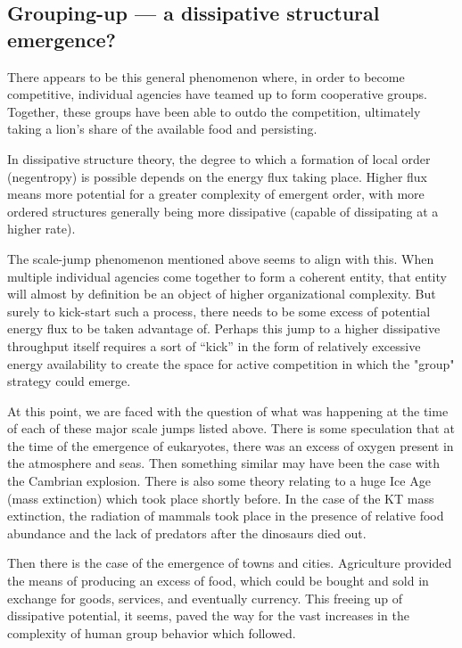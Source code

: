 \subsection{Grouping-up --- a dissipative structural emergence?}

There appears to be this general phenomenon where, in order to become competitive, individual agencies have teamed up to form cooperative groups. Together, these groups have been able to outdo the competition, ultimately taking a lion’s share of the available food and persisting.

In dissipative structure theory, the degree to which a formation of local order (negentropy) is possible depends on the energy flux taking place. Higher flux means more potential for a greater complexity of emergent order, with more ordered structures generally being more dissipative (capable of dissipating at a higher rate).

The scale-jump phenomenon mentioned above seems to align with this. When multiple individual agencies come together to form a coherent entity, that entity will almost by definition be an object of higher organizational complexity. But surely to kick-start such a process, there needs to be some excess of potential energy flux to be taken advantage of. Perhaps this jump to a higher dissipative throughput itself requires a sort of “kick” in the form of relatively excessive energy availability to create the space for active competition in which the "group" strategy could emerge.

At this point, we are faced with the question of what was happening at the time of each of these major scale jumps listed above. There is some speculation that at the time of the emergence of eukaryotes, there was an excess of oxygen present in the atmosphere and seas. Then something similar may have been the case with the Cambrian explosion. There is also some theory relating to a huge Ice Age (mass extinction) which took place shortly before. In the case of the KT mass extinction, the radiation of mammals took place in the presence of relative food abundance and the lack of predators after the dinosaurs died out.

Then there is the case of the emergence of towns and cities. Agriculture provided the means of producing an excess of food, which could be bought and sold in exchange for goods, services, and eventually currency. This freeing up of dissipative potential, it seems, paved the way for the vast increases in the complexity of human group behavior which followed.

